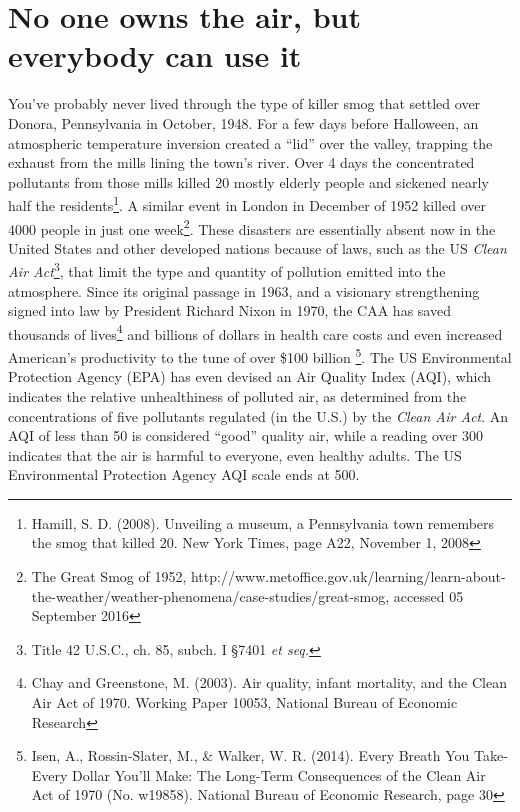\section{No one owns the air, but everybody can use it} \label{Air is a common property}
You've probably never lived through the type of killer smog that settled over Donora, Pennsylvania in October, 1948. For a few days before Halloween, an atmospheric temperature inversion created a ``lid'' over the valley, trapping the exhaust from the mills lining the town's river. Over 4 days the concentrated pollutants from those mills killed 20 mostly elderly people and sickened nearly half the residents\footnote{Hamill, S. D. (2008). Unveiling a museum, a Pennsylvania town remembers the smog that killed 20. New York Times, page A22, November 1, 2008}. A similar event in London in December of 1952 killed over 4000 people in just one week\footnote{The Great Smog of 1952, http://www.metoffice.gov.uk/learning/learn-about-the-weather/weather-phenomena/case-studies/great-smog, accessed 05 September 2016}. These disasters are essentially absent now in the United States and other developed nations because of laws, such as the US \emph{Clean Air Act}\footnote{Title 42 U.S.C., ch. 85, subch. I \S 7401 \textit{et seq.}}, that limit the type and quantity of pollution emitted into the atmosphere. Since its original passage in 1963, and a visionary strengthening signed into law by President Richard Nixon in 1970, the CAA has saved thousands of lives\footnote{Chay and Greenstone, M. (2003). Air quality, infant mortality, and the Clean Air Act of 1970. Working Paper 10053, National Bureau of Economic Research} and billions of dollars in health care costs and even increased American's productivity to the tune of over \$100 billion \footnote{Isen, A., Rossin-Slater, M., \& Walker, W. R. (2014). Every Breath You Take-Every Dollar You'll Make: The Long-Term Consequences of the Clean Air Act of 1970 (No. w19858). National Bureau of Economic Research, page 30}. The US Environmental Protection Agency (EPA) has even devised an Air Quality Index (AQI), which indicates the relative unhealthiness of polluted air, as determined from the concentrations of five pollutants regulated (in the U.S.) by the \emph{Clean Air Act}. An AQI of less than 50 is considered ``good'' quality air, while a reading over 300 indicates that the air is harmful to everyone, even healthy adults. The US Environmental Protection Agency AQI scale ends at 500.

